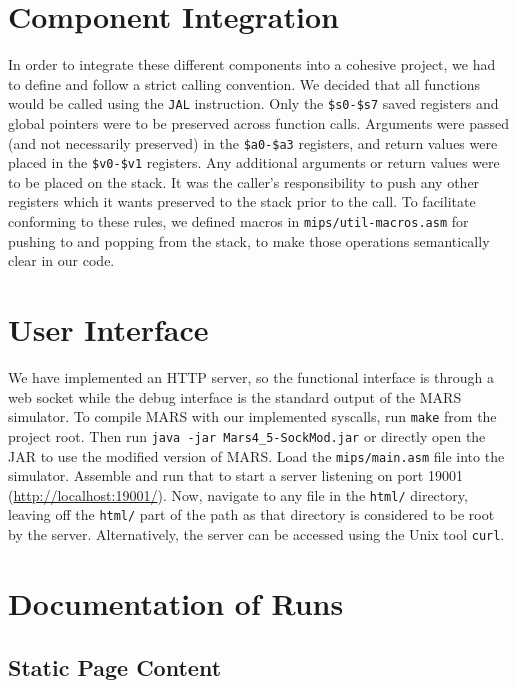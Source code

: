 \documentclass[journal,10pt]{IEEEtran}
\begin{document}
\section{Component Integration}

In order to integrate these different components into a cohesive project, we had
to define and follow a strict calling convention.  We decided that all
functions would be called using the \texttt{JAL} instruction.  Only the
\texttt{\$s0-\$s7} saved registers and global pointers were to be preserved
across function calls. Arguments were passed (and not necessarily preserved) in
the \texttt{\$a0-\$a3} registers, and return values were placed in the
\texttt{\$v0-\$v1} registers. Any additional arguments or return values were to
be placed on the stack. It was the caller's responsibility to push any other
registers which it wants preserved to the stack prior to the call.  To
facilitate conforming to these rules, we defined macros in
\texttt{mips/util-macros.asm} for pushing to and popping from the stack, to make
those operations semantically clear in our code.

\section{User Interface}

We have implemented an HTTP server, so the functional interface is through a web
socket while the debug interface is the standard output of the MARS simulator.
To compile MARS with our implemented syscalls, run \texttt{make} from the
project root. Then run \texttt{java -jar Mars4\_5-SockMod.jar} or directly open
the JAR to use the modified version of MARS. Load the \texttt{mips/main.asm}
file into the simulator. Assemble and run that to start a server listening on
port 19001 (\url{http://localhost:19001/}). Now, navigate to any file in the
\texttt{html/} directory, leaving off the \texttt{html/} part of the path as
that directory is considered to be root by the server. Alternatively, the server
can be accessed using the Unix tool \texttt{curl}.

\section{Documentation of Runs}

\subsection{Static Page Content}
\end{document}
